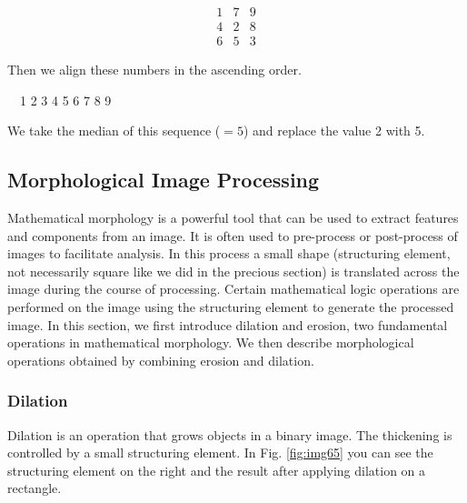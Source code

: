 \[
 \begin{matrix}
  1 & 7 & 9 \\
  4 & 2 & 8 \\
  6 & 5 & 3
 \end{matrix}
\]

Then we align these numbers in the ascending order. 

\ \ 1 2 3 4 5 6 7 8 9

We take the median of this sequence ($=5$) and replace the value 2 with
5.
\subsection{Morphological Image Processing}

Mathematical morphology is a powerful tool that can be used to extract
features and components from an image. It is often used to pre-process
or post-process of images to facilitate analysis. In this process a
small shape (structuring element, not necessarily square like we did in
the precious section) is translated across the image during the course
of processing. Certain mathematical logic operations are performed on
the image using the structuring element to generate the processed
image.
In this section, we first introduce dilation and erosion, two
fundamental operations in mathematical morphology. We then describe
morphological operations obtained by combining erosion and dilation. 
\subsubsection{Dilation}
Dilation is an operation that grows objects in a binary image. The
thickening is controlled by a small structuring element. In Fig. \ref{fig:img65} 
you can see the structuring element on the right and
the result after applying dilation on a rectangle.


